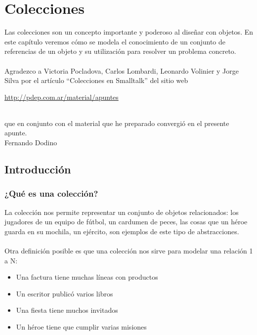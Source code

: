 \documentclass[a4paper,12pt]{book}
\begin{document}
\chapter{Colecciones}
Las colecciones son un concepto importante y poderoso al diseñar con objetos. En este capítulo veremos cómo
se modela el conocimiento de un conjunto de referencias de un objeto y su utilización para resolver un problema
concreto.
\\
\\
Agradezco a Victoria Pocladova, Carlos Lombardi, Leonardo Volinier y Jorge Silva por el artículo 
``Colecciones en Smalltalk'' del sitio web \\
\begin{minipage}[t]{0.5\textwidth}
     \href{http://pdep.com.ar/material/apuntes}{{\color{blue}http://pdep.com.ar/material/apuntes}}
\end{minipage}
\\que en conjunto con el material que he preparado convergió en
el presente apunte.
\\
 \hfill Fernando Dodino

\tableofcontents

\section{Introducción}

\subsection{¿Qué es una colección?}
La colección nos permite representar un conjunto de objetos relacionados: los jugadores de un equipo de fútbol, 
un cardumen de peces, las cosas que un héroe guarda en su mochila, un ejército, son ejemplos de este
tipo de abstracciones.\\
\\
Otra definición posible es que una colección nos sirve para modelar una relación 1 a N:\\
\begin{itemize}
\item Una factura tiene muchas líneas con productos
\item Un escritor publicó varios libros
\item Una fiesta tiene muchos invitados
\item Un héroe tiene que cumplir varias misiones
\end{itemize}
\end{document}
